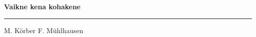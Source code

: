\documentclass[10pt]{book}
\begin{document}
{
  \samepage
  \raggedbottom
  \raggedright
  \sloppy


  \vspace{0.2in}

  \noindent\begin{minipage}{.1\textwidth}
    \hfill\vspace{0.1in}
  \end{minipage}%
  \noindent\begin{minipage}{.8\textwidth}
    \centering
    \bfseries
    \large Vaikne kena kohakene
  \end{minipage}%
  \noindent\begin{minipage}{.1\textwidth}
      \hfill\vspace{0.1in}
  \end{minipage}

  \nopagebreak[4]
  \vspace{0.1in}
  \nopagebreak[4]
  \hrule height 0.05ex
  \nopagebreak[4]
  \vspace{-0.05in}

  {\footnotesize M. K\"orber \hfill F. M\"uhlhausen }\\
  \vspace{0.01in}



}
\end{document}
